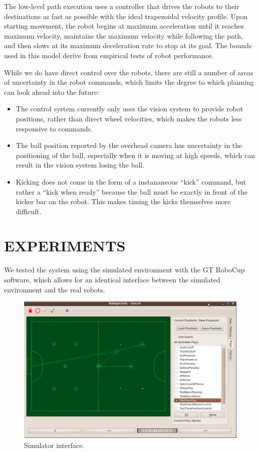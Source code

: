 \documentclass[a4paper, 10pt, conference]{ieeeconf}      %
\begin{document}
The low-level path execution uses a controller that drives the robots to their destinations as fast as possible with the ideal trapezoidal velocity profile.  Upon starting movement, the robot begins at maximum acceleration until it reaches maximum velocity, maintains the maximum velocity while following the path, and then slows at its maximum deceleration rate to stop at its goal.  The bounds used in this model derive from empirical tests of robot performance.  

While we do have direct control over the robots, there are still a number of areas of uncertainty in the robot commands, which limits the degree to which planning can look ahead into the future:
\begin{itemize}
 \item The control system currently only uses the vision system to provide robot positions, rather than direct wheel velocities, which makes the robots less responsive to commands.
 \item The ball position reported by the overhead camera has uncertainty in the positioning of the ball, especially when it is moving at high speeds, which can result in the vision system losing the ball.
 \item Kicking does not come in the form of a instananeous ``kick'' command, but rather a ``kick when ready'' because the ball must be exactly in front of the kicker bar on the robot.  This makes timing the kicks themselves more difficult.  
\end{itemize}

\section{EXPERIMENTS}
We tested the system using the simulated environment with the GT RoboCup software, which allows for an identical interface between the simulated environment and the real robots.

\begin{figure}[ht!]
\begin{center}
\includegraphics[totalheight=1.6in]{ui}
\end{center}
\caption{Simulator interface.}
\label{experiment1fig1}
\end{figure}
\end{document}
